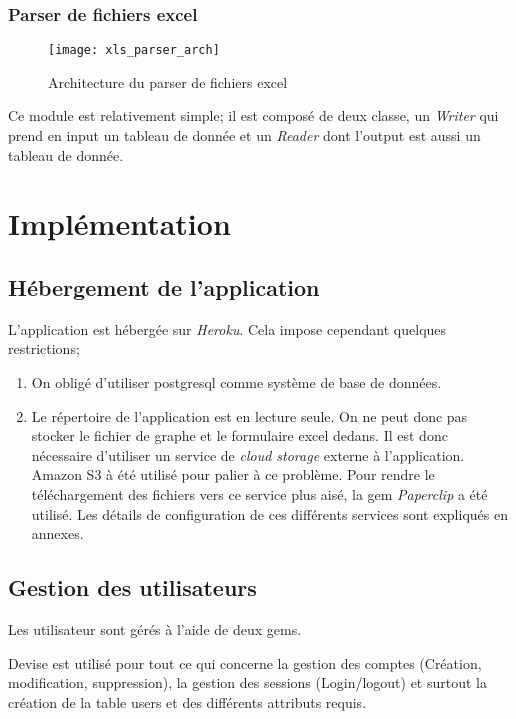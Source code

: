 \subsubsection{Parser de fichiers excel}
\label{xls_parser}
\begin{figure}[H]
\centering
\caption{Architecture du parser de fichiers excel}
\label{xls_parser_arch}
\texttt{[image: xls\_parser\_arch]}
\end{figure}

Ce module est relativement simple; il est composé de deux classe, un \textit{Writer} qui prend en input un tableau de donnée et un \textit{Reader} dont l'output est aussi un tableau de donnée.


\clearpage
\section{Implémentation}
\subsection{Hébergement de l'application}
L'application est hébergée sur \textit{Heroku}. Cela impose cependant quelques restrictions;
\begin{enumerate}
  \item On obligé d'utiliser postgresql comme système de base de données.
  \item Le répertoire de l'application est en lecture seule. On ne peut donc pas stocker le fichier de graphe et le formulaire excel dedans. Il est donc nécessaire d'utiliser un service de \textit{cloud storage} externe à l'application. Amazon S3 à été utilisé pour palier à ce problème. Pour rendre le téléchargement des fichiers vers ce service plus aisé, la gem \textit{Paperclip} a été utilisé. Les détails de configuration de ces différents services sont expliqués en annexes. 
\end{enumerate}
\subsection{Gestion des utilisateurs}
Les utilisateur sont gérés à l'aide de deux gems. 

Devise est utilisé pour tout ce qui concerne la gestion des comptes (Création, modification, suppression), la gestion des sessions (Login/logout) et surtout la création de la table users et des différents attributs requis.

